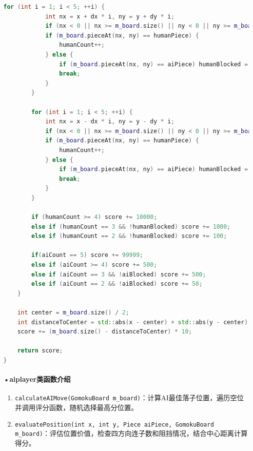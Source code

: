 \documentclass[UTF8]{ctexart}
\begin{document}
\begin{lstlisting}[language=C++]
		for (int i = 1; i < 5; ++i) {
			int nx = x + dx * i, ny = y + dy * i;
			if (nx < 0 || nx >= m_board.size() || ny < 0 || ny >= m_board.size()) break;
			if (m_board.pieceAt(nx, ny) == humanPiece) {
				humanCount++;
			} else {
				if (m_board.pieceAt(nx, ny) == aiPiece) humanBlocked = true;
				break;
			}
		}

		for (int i = 1; i < 5; ++i) {
			int nx = x - dx * i, ny = y - dy * i;
			if (nx < 0 || nx >= m_board.size() || ny < 0 || ny >= m_board.size()) break;
			if (m_board.pieceAt(nx, ny) == humanPiece) {
				humanCount++;
			} else {
				if (m_board.pieceAt(nx, ny) == aiPiece) humanBlocked = true;
				break;
			}
		}

		if (humanCount >= 4) score += 10000;
		else if (humanCount == 3 && !humanBlocked) score += 1000;
		else if (humanCount == 2 && !humanBlocked) score += 100;
		
		if(aiCount == 5) score += 99999;
		else if (aiCount >= 4) score += 500;
		else if (aiCount == 3 && !aiBlocked) score += 500;
		else if (aiCount == 2 && !aiBlocked) score += 50;
	}
	
	int center = m_board.size() / 2;
	int distanceToCenter = std::abs(x - center) + std::abs(y - center);
	score += (m_board.size() - distanceToCenter) * 10;
	
	return score;
}
\end{lstlisting}

\paragraph{•aiplayer类函数介绍}
\begin{enumerate}
    \item \texttt{calculateAIMove(GomokuBoard m\_board)}：计算AI最佳落子位置，遍历空位并调用评分函数，随机选择最高分位置。
    \item \texttt{evaluatePosition(int x, int y, Piece aiPiece, GomokuBoard m\_board)}：评估位置价值，检查四方向连子数和阻挡情况，结合中心距离计算得分。
\end{enumerate}
\end{document}
